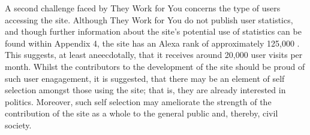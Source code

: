 A second challenge faced by They Work for You concerns the type of users accessing the site.
Although They Work for You do not publish user statistics, and though further information about the site's potential use of statistics can be found within Appendix 4, the site has an Alexa rank of approximately 125,000 \cite{alexa-rank}.
This suggests, at least aneecdotally, that it receives around 20,000 user visits per month.
Whilst the contributors to the development of the site should be proud of such user enagagement, it is suggested, that there may be an element of self selection amongst those using the site; that is, they are already interested in politics.
Moreover, such self selection may ameliorate the strength of the contribution of the site as a whole to the general public and, thereby, civil society.